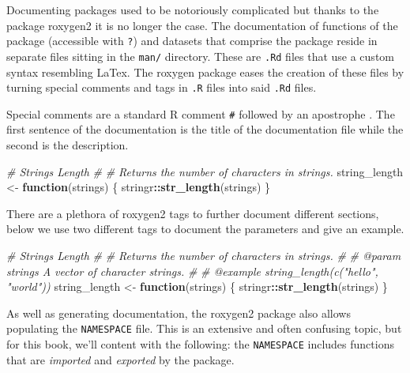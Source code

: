 \documentclass[
]{krantz}
\makeatletter
\newenvironment{Shaded}{\begin{snugshade}}{\end{snugshade}}
\newcommand{\CommentTok}[1]{\textcolor[rgb]{0.37,0.37,0.37}{\textit{#1}}}
\newcommand{\ControlFlowTok}[1]{\textcolor[rgb]{0.27,0.27,0.27}{\textbf{#1}}}
\newcommand{\KeywordTok}[1]{\textcolor[rgb]{0.27,0.27,0.27}{\textbf{#1}}}
\newcommand{\NormalTok}[1]{#1}
\newcommand{\OperatorTok}[1]{\textcolor[rgb]{0.43,0.43,0.43}{\textbf{#1}}}
\newcommand{\StringTok}[1]{\textcolor[rgb]{0.5,0.5,0.5}{#1}}
\newenvironment{kframe}{%
\medskip{}
\setlength{\fboxsep}{.8em}
 \def\at@end@of@kframe{}%
 \ifinner\ifhmode%
  \def\at@end@of@kframe{\end{minipage}}%
  \begin{minipage}{\columnwidth}%
 \fi\fi%
 \def\FrameCommand##1{\hskip\@totalleftmargin \hskip-\fboxsep
 \colorbox{shadecolor}{##1}\hskip-\fboxsep
     \hskip-\linewidth \hskip-\@totalleftmargin \hskip\columnwidth}%
 \MakeFramed {\advance\hsize-\width
   \@totalleftmargin\z@ \linewidth\hsize
   \@setminipage}}%
 {\par\unskip\endMakeFramed%
 \at@end@of@kframe}
\renewenvironment{Shaded}{\begin{kframe}}{\end{kframe}}
\makeatother
\begin{document}
Documenting packages used to be notoriously complicated but thanks to the package roxygen2 it is no longer the case. The documentation of functions of the package (accessible with \texttt{?}) and datasets that comprise the package reside in separate files sitting in the \texttt{man/} directory. These are \texttt{.Rd} files that use a custom syntax resembling LaTex. The roxygen package eases the creation of these files by turning special comments and tags in \texttt{.R} files into said \texttt{.Rd} files.

Special comments are a standard R comment \texttt{\#} followed by an apostrophe \texttt{\textquotesingle{}}. The first sentence of the documentation is the title of the documentation file while the second is the description.

\begin{Shaded}
\begin{Highlighting}[]
\CommentTok{\#\textquotesingle{} Strings Length}
\CommentTok{\#\textquotesingle{} }
\CommentTok{\#\textquotesingle{} Returns the number of characters in strings. }
\NormalTok{string\_length <{-}}\StringTok{ }\ControlFlowTok{function}\NormalTok{(strings) \{}
\NormalTok{  stringr}\OperatorTok{::}\KeywordTok{str\_length}\NormalTok{(strings)}
\NormalTok{\}}
\end{Highlighting}
\end{Shaded}

There are a plethora of roxygen2 tags to further document different sections, below we use two different tags to document the parameters and give an example.

\begin{Shaded}
\begin{Highlighting}[]
\CommentTok{\#\textquotesingle{} Strings Length}
\CommentTok{\#\textquotesingle{} }
\CommentTok{\#\textquotesingle{} Returns the number of characters in strings. }
\CommentTok{\#\textquotesingle{} }
\CommentTok{\#\textquotesingle{} @param strings A vector of character strings.}
\CommentTok{\#\textquotesingle{} }
\CommentTok{\#\textquotesingle{} @example string\_length(c("hello", "world"))}
\NormalTok{string\_length <{-}}\StringTok{ }\ControlFlowTok{function}\NormalTok{(strings) \{}
\NormalTok{  stringr}\OperatorTok{::}\KeywordTok{str\_length}\NormalTok{(strings)}
\NormalTok{\}}
\end{Highlighting}
\end{Shaded}

As well as generating documentation, the roxygen2 package also allows populating the \texttt{NAMESPACE} file. This is an extensive and often confusing topic, but for this book, we'll content with the following: the \texttt{NAMESPACE} includes functions that are \emph{imported} and \emph{exported} by the package.
\end{document}
